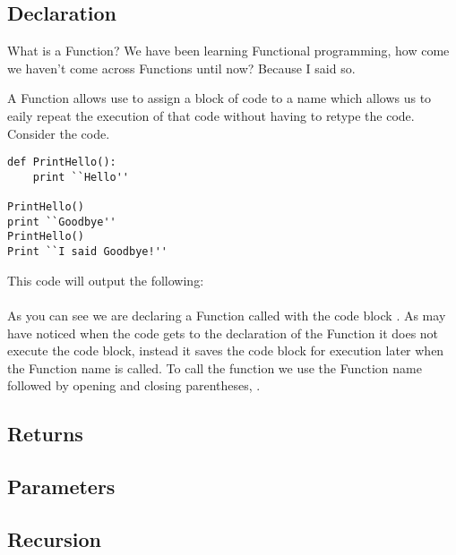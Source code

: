 \subsection{Declaration}
What is a Function?
We have been learning Functional programming, how come we haven't come across Functions until now?
Because I said so.
\par

A Function allows use to assign a block of code to a name which allows us to eaily repeat the execution of that code without having
to retype the code.
Consider the code.

\begin{lstlisting}[caption={Function Candidate Example}]
def PrintHello():
    print ``Hello''

PrintHello()
print ``Goodbye''
PrintHello()
Print ``I said Goodbye!''
\end{lstlisting}

This code will output the following:\\
\\
As you can see we are declaring a Function called  with the code block .
As may have noticed when the code gets to the declaration of the Function it does not execute the code block, instead it
saves the code block for execution later when the Function name is called.
To call the function we use the Function name followed by opening and closing parentheses, .

\subsection{Returns}

\subsection{Parameters}

\subsection{Recursion}
